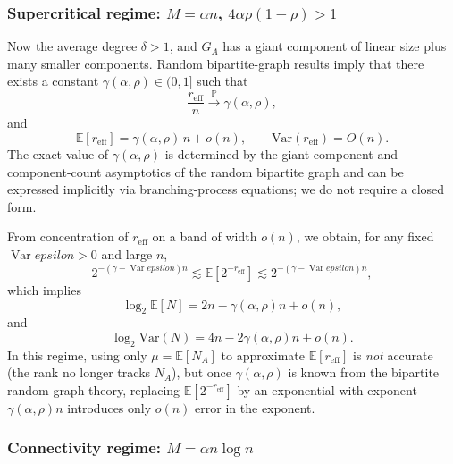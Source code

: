 \documentclass[a4paper,onecolumn,notitlepage,nofootinbib,longbibliography,superscriptaddress, floatfix, pra, aps, 10pt]{revtex4-2}
\begin{document}
\subsubsection{Supercritical regime: $M = \alpha n$, $4\alpha\rho(1-\rho)>1$}

Now the average degree $\delta>1$, and $G_A$ has a giant component of linear size plus many smaller components. Random bipartite-graph results imply that there exists a constant $\gamma(\alpha,\rho)\in(0,1]$ such that
\begin{equation}
  \frac{r_{\mathrm{eff}}}{n}\xrightarrow{\mathbb{P}}\gamma(\alpha,\rho),
\end{equation}
and
\begin{equation}
  \mathbb{E}[r_{\mathrm{eff}}] = \gamma(\alpha,\rho)\,n + o(n),\qquad
  \mathrm{Var}(r_{\mathrm{eff}}) = O(n).
\end{equation}
The exact value of $\gamma(\alpha,\rho)$ is determined by the giant-component and component-count asymptotics of the random bipartite graph and can be expressed implicitly via branching-process equations; we do not require a closed form.

From concentration of $r_{\mathrm{eff}}$ on a band of width $o(n)$, we obtain, for any fixed $\operatorname*{Var}epsilon>0$ and large $n$,
\begin{equation}
  2^{-(\gamma+\operatorname*{Var}epsilon)n} \lesssim \mathbb{E}[2^{-r_{\mathrm{eff}}}] 
  \lesssim 2^{-(\gamma-\operatorname*{Var}epsilon)n},
\end{equation}
which implies
\begin{equation}
  \log_2\mathbb{E}[N]
  = 2n - \gamma(\alpha,\rho)n + o(n),
\end{equation}
and
\begin{equation}
  \log_2\mathrm{Var}(N)
  = 4n - 2\gamma(\alpha,\rho)n + o(n).
\end{equation}
In this regime, using only $\mu=\mathbb{E}[N_A]$ to approximate $\mathbb{E}[r_{\mathrm{eff}}]$ is \emph{not} accurate (the rank no longer tracks $N_A$), but once $\gamma(\alpha,\rho)$ is known from the bipartite random-graph theory, replacing $\mathbb{E}[2^{-r_{\mathrm{eff}}}]$ by an exponential with exponent $\gamma(\alpha,\rho)n$ introduces only $o(n)$ error in the exponent.

\subsubsection{Connectivity regime: $M = \alpha n\log n$}
\end{document}

